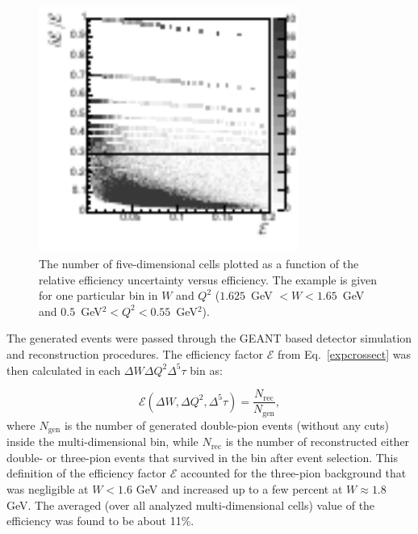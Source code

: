 \documentclass[prc,twocolumn,superscriptaddress,showpacs,amssymb,amsmath,amsfonts,aps,nofootinbib]{revtex4-1}
\begin{document}
\begin{figure}[htp]
\begin{center}
\includegraphics[width=8.5cm,clip,trim={0 1mm 0 0}]{pictures/efficiency/eff_err_draw.pdf}
\caption{\small The number of five-dimensional cells plotted as a function of the relative efficiency uncertainty versus efficiency. The example is given for one particular bin in $W$ and $Q^2$ ($1.625$~GeV $< W < 1.65$~GeV and $0.5$~GeV$^{2} < Q^{2} < 0.55$~GeV$^{2}$).} \label{fig:eff_err}
\end{center}
\end{figure}

The generated events were passed through the GEANT based detector simulation and reconstruction procedures. The efficiency factor $\mathcal{E}$ from Eq.~\eqref{expcrossect} was then calculated in each $\Delta W\Delta Q^{2}\Delta^{5} \tau$ bin as:

\begin{equation}
\mathcal{E}(\Delta W, \Delta Q^{2}, \Delta^{5} \tau) = \frac{N_{\text{rec}}}{N_{\text{gen}}},
\label{efficiency}
\end{equation}
where $N_{\text{gen}}$ is the number of generated double-pion events (without any cuts) inside the multi-dimensional bin, while $N_{\text{rec}}$ is the number of reconstructed either double- or three-pion events that survived in the bin after event selection. This definition of the efficiency factor $\mathcal{E}$ accounted for the three-pion background that was negligible at $W < 1.6$ GeV  and
increased up to a few percent at $W \approx 1.8$ GeV. The averaged (over all analyzed multi-dimensional cells) value of the efficiency was found to be about 11\%.
\end{document}
